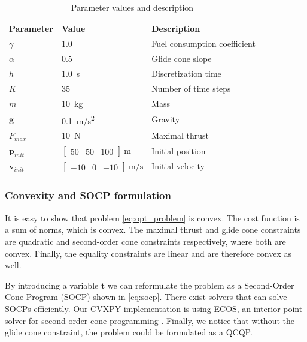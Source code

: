 \documentclass[12pt, letterpaper]{article}
\begin{document}
\begin{table}[h!]   
    \centering
    \begin{tabular}{lll}
        \toprule
        Parameter & Value & Description \\
        \midrule
        $\gamma$ & 1.0 & Fuel consumption coefficient \\
        $\alpha$ & 0.5 & Glide cone slope \\
        $h$ & \SI{1.0}{\second} & Discretization time \\
        $K$ & 35 & Number of time steps \\
        $m$ & \SI{10}{\kilo\gram} & Mass \\
        $\mathbf{g}$ & \SI{0.1}{\meter/\second^2} & Gravity \\
        $F_{max}$ & \SI{10}{\newton} & Maximal thrust \\
        $\mathbf{p}_{init}$ & $\begin{bmatrix}50&50&100\end{bmatrix} \SI{}{\meter} $ & Initial position \\
        $\mathbf{v}_{init}$ & $\begin{bmatrix}-10&0&-10\end{bmatrix} \SI{}{\meter/\second} $ & Initial velocity \\
        \bottomrule
    \end{tabular}
    \caption{Parameter values and description}
    \label{tab:param}
\end{table}

\subsubsection{Convexity and SOCP formulation}
It is easy to show that problem \ref{eq:opt_problem} is convex.
The cost function is a sum of norms, which is convex.
The maximal thrust and glide cone constraints are quadratic and second-order cone constraints respectively, where both are convex.
Finally, the equality constraints are linear and are therefore convex as well. \cite{Boyd:CVXcourse}

By introducing a variable $\mathbf{t}$ we can reformulate the problem as a Second-Order Cone Program (SOCP) shown in \ref{eq:socp}.
There exist solvers that can solve SOCPs efficiently.
Our CVXPY implementation is using ECOS, an interior-point solver for second-order cone programming \cite{bib:Domahidi2013ecos}.
Finally, we notice that without the glide cone constraint, the problem could be formulated as a QCQP.
\end{document}
